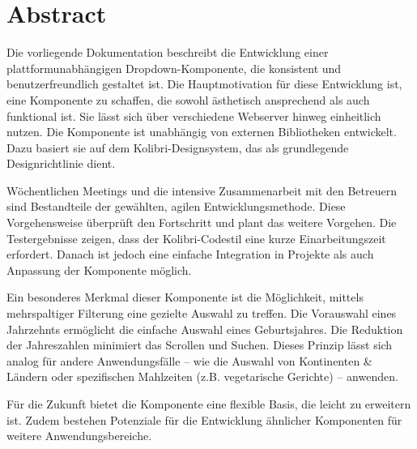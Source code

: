 \chapter*{Abstract}

Die vorliegende Dokumentation beschreibt die Entwicklung einer plattformunabhängigen Dropdown-Komponente, die konsistent und benutzerfreundlich gestaltet ist. 
Die Hauptmotivation für diese Entwicklung ist, eine Komponente zu schaffen, die sowohl ästhetisch ansprechend als auch funktional ist. 
Sie lässt sich über verschiedene Webserver hinweg einheitlich nutzen. 
Die Komponente ist unabhängig von externen Bibliotheken entwickelt. 
Dazu basiert sie auf dem Kolibri-Designsystem, das als grundlegende Designrichtlinie dient. 

Wöchentlichen Meetings und die intensive Zusammenarbeit mit den Betreuern sind Bestandteile der gewählten, agilen Entwicklungsmethode. 
Diese Vorgehensweise überprüft den Fortschritt und plant das weitere Vorgehen. 
Die Testergebnisse zeigen, dass der Kolibri-Codestil eine kurze Einarbeitungszeit erfordert. 
Danach ist jedoch eine einfache Integration in Projekte als auch Anpassung der Komponente möglich. 

Ein besonderes Merkmal dieser Komponente ist die Möglichkeit, mittels mehrspaltiger Filterung eine gezielte Auswahl zu treffen. 
Die Vorauswahl eines Jahrzehnts ermöglicht die einfache Auswahl eines Geburtsjahres. 
Die Reduktion der Jahreszahlen minimiert das Scrollen und Suchen. 
Dieses Prinzip lässt sich analog für andere Anwendungsfälle – wie die Auswahl von Kontinenten \& Ländern oder spezifischen Mahlzeiten (z.B. vegetarische Gerichte) – anwenden. 

Für die Zukunft bietet die Komponente eine flexible Basis, die leicht zu erweitern ist. 
Zudem bestehen Potenziale für die Entwicklung ähnlicher Komponenten für weitere Anwendungsbereiche. 
